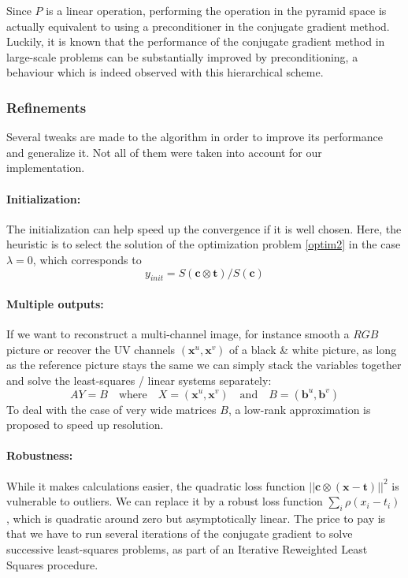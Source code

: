 \documentclass{article}
\begin{document}
Since $P$ is a linear operation, performing the operation in the pyramid space is actually equivalent to using a preconditioner in the conjugate gradient method.
Luckily, it is known that the performance of the conjugate gradient method in large-scale problems can be substantially improved by preconditioning, a behaviour which is indeed observed with this hierarchical scheme.

\subsubsection{Refinements}

Several tweaks are made to the algorithm in order to improve its performance and generalize it. Not all of them were taken into account for our implementation.

\paragraph{Initialization:} The initialization can help speed up the convergence if it is well chosen. Here, the heuristic is to select the solution of the optimization problem \eqref{optim2} in the case $\lambda = 0$, which corresponds to
\begin{equation}
    y_{init} = S(\textbf{c} \otimes \textbf{t}) / S(\textbf{c})
\end{equation}

\paragraph{Multiple outputs:} If we want to reconstruct a multi-channel image, for instance smooth a $RGB$ picture or recover the UV channels $(\textbf{x}^u, \textbf{x}^v)$ of a black \& white picture, as long as the reference picture stays the same we can simply stack the variables together and solve the least-squares / linear systems separately:
\begin{equation}
    A Y = B \quad \text{where} \quad X = (\textbf{x}^u, \textbf{x}^v) \quad \text{and} \quad B = (\textbf{b}^u, \textbf{b}^v)
\end{equation}
To deal with the case of very wide matrices $B$, a low-rank approximation is proposed to speed up resolution.

\paragraph{Robustness:} While it makes calculations easier, the quadratic loss function $||\textbf{c} \otimes (\textbf{x} - \textbf{t})||^2$ is vulnerable to outliers. We can replace it by a robust loss function $\sum_{i}\rho(x_i - t_i)$, which is quadratic around zero but asymptotically linear. The price to pay is that we have to run several iterations of the conjugate gradient to solve successive least-squares problems, as part of an Iterative Reweighted Least Squares procedure.
\end{document}
